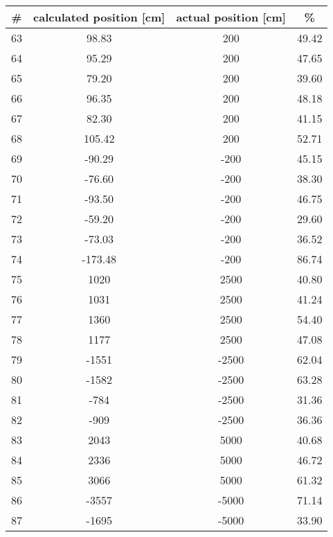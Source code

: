  \begin{tabular}{|c|c|c|c|}
  \hline 
  \# & calculated position [cm] & actual position [cm] & \% \\ 
  \hline
 63 & 98.83 & 200  & 49.42  \\ \hline
 64 & 95.29 & 200  & 47.65  \\ \hline
 65 & 79.20 & 200  & 39.60  \\ \hline
 66 & 96.35 & 200  & 48.18  \\ \hline
 67 & 82.30 & 200  & 41.15  \\ \hline
 68 & 105.42& 200  & 52.71  \\ \hline %
 69 & -90.29 & -200  & 45.15  \\ \hline
 70 & -76.60 & -200  & 38.30  \\ \hline
 71 & -93.50 & -200  & 46.75  \\ \hline
 72 & -59.20 & -200  & 29.60  \\ \hline
 73 & -73.03 & -200  & 36.52  \\ \hline
 74 & -173.48& -200  & 86.74  \\ \hline %
 75 & 1020 & 2500  & 40.80  \\ \hline
 76 & 1031 & 2500  & 41.24  \\ \hline
 77 & 1360 & 2500  & 54.40  \\ \hline
 78 & 1177 & 2500  & 47.08  \\ \hline %
 79 & -1551 & -2500  & 62.04  \\ \hline
 80 & -1582 & -2500  & 63.28  \\ \hline
 81 & -784  & -2500  & 31.36  \\ \hline
 82 & -909  & -2500  & 36.36  \\ \hline %
 83 & 2043 & 5000  & 40.68  \\ \hline
 84 & 2336 & 5000  & 46.72  \\ \hline
 85 & 3066 & 5000  & 61.32  \\ \hline %
 86 & -3557 & -5000  & 71.14  \\ \hline
 87 & -1695 & -5000  & 33.90  \\ \hline
 \end{tabular} 